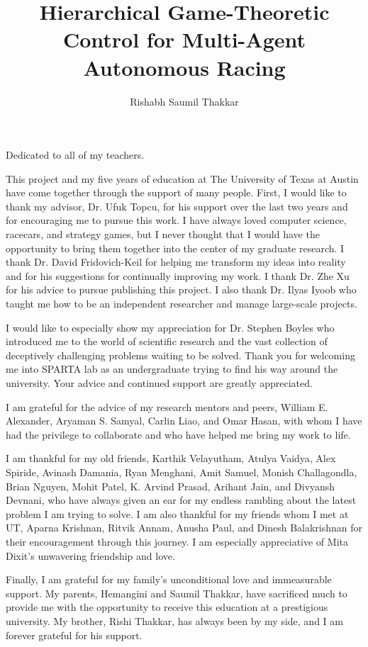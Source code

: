\documentclass[12pt]{report}
\author{Rishabh Saumil Thakkar}  	%
\title{Hierarchical Game-Theoretic Control for Multi-Agent Autonomous Racing}
\theoremstyle{definition}
\theoremstyle{remark}
\numberwithin{equation}{section}
\begin{document}
\copyrightpage
\commcertpage
\titlepage
\begin{dedication}
Dedicated to all of my teachers.
\end{dedication}
\begin{acknowledgments}	
This project and my five years of education at The University of Texas at Austin have come together through the support of many people. First, I would like to thank my advisor, Dr. Ufuk Topcu, for his support over the last two years and for encouraging me to pursue this work. I have always loved computer science, racecars, and strategy games, but I never thought that I would have the opportunity to bring them together into the center of my graduate research. I thank Dr. David Fridovich-Keil for helping me transform my ideas into reality and for his suggestions for continually improving my work. I thank Dr. Zhe Xu for his advice to pursue publishing this project. I also thank Dr. Ilyas Iyoob who taught me how to be an independent researcher and manage large-scale projects.

I would like to especially show my appreciation for Dr. Stephen Boyles who introduced me to the world of scientific research and the vast collection of deceptively challenging problems waiting to be solved. Thank you for welcoming me into SPARTA lab as an undergraduate trying to find his way around the university. Your advice and continued support are greatly appreciated. 

I am grateful for the advice of my research mentors and peers, William E. Alexander, Aryaman S. Samyal, Carlin Liao, and Omar Hasan, with whom I have had the privilege to collaborate and who have helped me bring my work to life.

I am thankful for my old friends, Karthik Velayutham, Atulya Vaidya, Alex Spiride, Avinash Damania, Ryan Menghani, Amit Samuel, Monish Challagondla, Brian Nguyen, Mohit Patel, K. Arvind Prasad, Arihant Jain, and Divyansh Devnani, who have always given an ear for my endless rambling about the latest problem I am trying to solve. I am also thankful for my friends whom I met at UT, Aparna Krishnan, Ritvik Annam, Anusha Paul, and Dinesh Balakrishnan for their encouragement through this journey. I am especially appreciative of Mita Dixit's unwavering friendship and love. 

Finally, I am grateful for my family's unconditional love and immeasurable support. My parents, Hemangini and Saumil Thakkar, have sacrificed much to provide me with the opportunity to receive this education at a prestigious university. My brother, Rishi Thakkar, has always been by my side, and I am forever grateful for his support. 
\end{acknowledgments}
\end{document}
